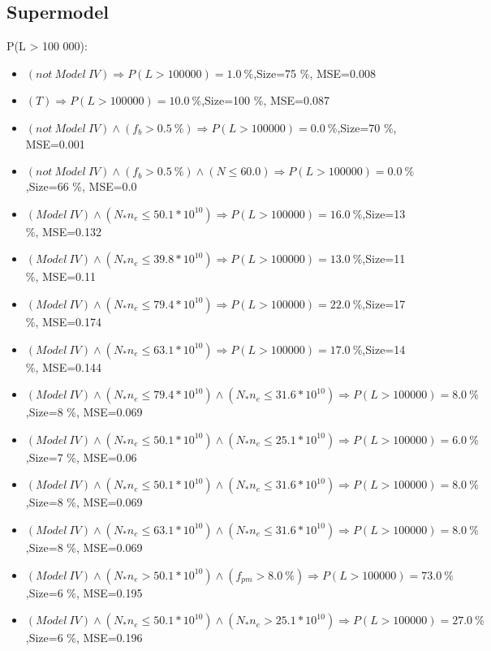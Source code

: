 \documentclass[numbered]{CSL}
\begin{document}
\subsection{Supermodel}
P(L > 100 000):
\begin{itemize}
\item $(not~Model~IV) \Rightarrow P(L > 100 000) = 1.0~\%$,\hfill Size=75 \%, MSE=0.008
\item $(T) \Rightarrow P(L > 100 000) = 10.0~\%$,\hfill Size=100 \%, MSE=0.087
\item $(not~Model~IV) \land (f_b > 0.5~\%) \Rightarrow P(L > 100 000) = 0.0~\%$,\hfill Size=70 \%, MSE=0.001
\item $(not~Model~IV) \land (f_b > 0.5~\%) \land (N \leq 60.0) \Rightarrow P(L > 100 000) = 0.0~\%$,\hfill Size=66 \%, MSE=0.0
\item $(Model~IV) \land (N_* n_e \leq 50.1 * 10^{10}) \Rightarrow P(L > 100 000) = 16.0~\%$,\hfill Size=13 \%, MSE=0.132
\item $(Model~IV) \land (N_* n_e \leq 39.8 * 10^{10}) \Rightarrow P(L > 100 000) = 13.0~\%$,\hfill Size=11 \%, MSE=0.11
\item $(Model~IV) \land (N_* n_e \leq 79.4 * 10^{10}) \Rightarrow P(L > 100 000) = 22.0~\%$,\hfill Size=17 \%, MSE=0.174
\item $(Model~IV) \land (N_* n_e \leq 63.1 * 10^{10}) \Rightarrow P(L > 100 000) = 17.0~\%$,\hfill Size=14 \%, MSE=0.144
\item $(Model~IV) \land (N_* n_e \leq 79.4 * 10^{10}) \land (N_* n_e \leq 31.6 * 10^{10}) \Rightarrow P(L > 100 000) = 8.0~\%$,\hfill Size=8 \%, MSE=0.069
\item $(Model~IV) \land (N_* n_e \leq 50.1 * 10^{10}) \land (N_* n_e \leq 25.1 * 10^{10}) \Rightarrow P(L > 100 000) = 6.0~\%$,\hfill Size=7 \%, MSE=0.06
\item $(Model~IV) \land (N_* n_e \leq 50.1 * 10^{10}) \land (N_* n_e \leq 31.6 * 10^{10}) \Rightarrow P(L > 100 000) = 8.0~\%$,\hfill Size=8 \%, MSE=0.069
\item $(Model~IV) \land (N_* n_e \leq 63.1 * 10^{10}) \land (N_* n_e \leq 31.6 * 10^{10}) \Rightarrow P(L > 100 000) = 8.0~\%$,\hfill Size=8 \%, MSE=0.069
\item $(Model~IV) \land (N_* n_e > 50.1 * 10^{10}) \land (f_{pm} > 8.0~\%) \Rightarrow P(L > 100 000) = 73.0~\%$,\hfill Size=6 \%, MSE=0.195
\item $(Model~IV) \land (N_* n_e \leq 50.1 * 10^{10}) \land (N_* n_e > 25.1 * 10^{10}) \Rightarrow P(L > 100 000) = 27.0~\%$,\hfill Size=6 \%, MSE=0.196

\end{itemize}
\end{document}
